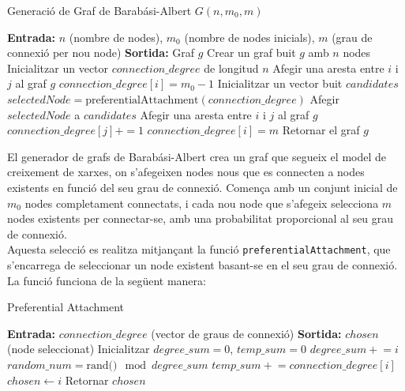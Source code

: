 \documentclass[a4paper]{article}
\begin{document}
	\begin{algorithm} [H]
		\caption{Generació de Graf de Barabási-Albert $G(n, m_0, m)$}
		\begin{algorithmic} [1]
			\Statex \textbf{Entrada:} $n$ (nombre de nodes), $m_0$ (nombre de nodes inicials), $m$ (grau de connexió per nou node)
			\Statex \textbf{Sortida:} Graf $g$
			\Statex \vspace{-0.25em}
			\State Crear un graf buit $g$ amb $n$ nodes
			\State Inicialitzar un vector $connection\_degree$ de longitud $n$
					\State Afegir una aresta entre $i$ i $j$ al graf $g$
				\EndFor
				\State $connection\_degree[i] = m_0 - 1$
			\EndFor
				\State Inicialitzar un vector buit $candidates$
					\State $selectedNode = \text{preferentialAttachment}(connection\_degree)$
						\State Afegir $selectedNode$ a $candidates$
					\EndIf
				\EndWhile
					\State Afegir una aresta entre $i$ i $j$ al graf $g$
					\State $connection\_degree[j] += 1$
				\EndFor
				\State $connection\_degree[i] = m$
			\EndFor
			\State Retornar el graf $g$
		\end{algorithmic}
	\end{algorithm}
	
	El generador de grafs de Barabási-Albert crea un graf que segueix el model de creixement de xarxes, on s'afegeixen nodes nous que es connecten a nodes existents en funció del seu grau de connexió. Comença amb un conjunt inicial de \( m_0 \) nodes completament connectats, i cada nou node que s'afegeix selecciona \( m \) nodes existents per connectar-se, amb una probabilitat proporcional al seu grau de connexió. \\
	
	Aquesta selecció es realitza mitjançant la funció \texttt{preferentialAttachment}, que s'encarrega de seleccionar un node existent basant-se en el seu grau de connexió. La funció funciona de la següent manera: \\
	
	\begin{algorithm} [H]
		\caption{Preferential Attachment}
		\begin{algorithmic} [1]
			\Statex \textbf{Entrada:} $connection\_degree$ (vector de graus de connexió)
			\Statex \textbf{Sortida:} $chosen$ (node seleccionat)
			\State Inicialitzar $degree\_sum = 0$, $temp\_sum = 0$
				\State $degree\_sum \mathrel{+}= i$
			\EndFor
			\State $random\_num = \text{rand()} \mod degree\_sum$
				\State $temp\_sum \mathrel{+}= connection\_degree[i]$
					\State $chosen \gets i$
					\State
				\EndIf
			\EndFor
			\State Retornar $chosen$
		\end{algorithmic}
	\end{algorithm}
	
\end{document}
